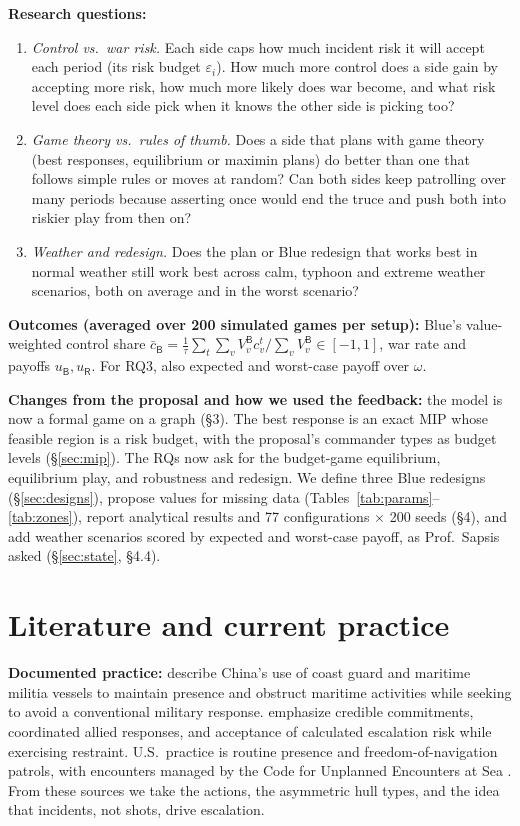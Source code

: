 \documentclass[10pt]{article}
\newcommand{\1}{\mathbf{1}}
\newcommand{\B}{\mathsf{B}}
\newcommand{\Rd}{\mathsf{R}}
\begin{document}
\textbf{Research questions:}
\begin{enumerate}[label=\textbf{RQ\arabic*.}]
\item \emph{Control vs.\ war risk.} Each side caps how much incident risk it will accept each period (its risk
budget $\varepsilon_i$). How much more control does a side gain by accepting more risk, how much more likely does
war become, and what risk level does each side pick when it knows the other side is picking too?
\item \emph{Game theory vs.\ rules of thumb.} Does a side that plans with game theory (best responses,
equilibrium or maximin plans) do better than one that follows simple rules or moves at random? Can both sides
keep patrolling over many periods because asserting once would end the truce and push both into riskier play from
then on?
\item \emph{Weather and redesign.} Does the plan or Blue redesign that works best in normal weather still work
best across calm, typhoon and extreme weather scenarios, both on average and in the worst scenario?
\end{enumerate}
\textbf{Outcomes (averaged over 200 simulated games per setup):} Blue's value-weighted control share
$\bar c_\B=\frac1\tau\sum_t\sum_{v}V^\B_v c^t_v/\sum_v V^\B_v\in[-1,1]$, war rate and payoffs $u_\B,u_\Rd$. For RQ3,
also expected and worst-case payoff over $\omega$.

\textbf{Changes from the proposal and how we used the feedback:} the model is now a formal game on a graph (\S3).
The best response is an exact MIP whose feasible region is a risk budget, with the proposal's commander types as
budget levels (\S\ref{sec:mip}). The RQs now ask for the budget-game equilibrium, equilibrium play, and robustness
and redesign. We define three Blue redesigns (\S\ref{sec:designs}), propose values for missing data
(Tables~\ref{tab:params}--\ref{tab:zones}), report analytical results and 77 configurations $\times$ 200 seeds
(\S4), and add weather scenarios scored by expected and worst-case payoff, as Prof.\ Sapsis asked (\S\ref{sec:state},
\S4.4).

\section{Literature and current practice}
\textbf{Documented practice:} 
\citet{helmus2024} describe China's use of coast guard and maritime militia vessels to 
maintain presence and obstruct maritime activities while seeking to avoid a conventional military response. 
\citet{green2017} emphasize credible commitments, coordinated allied responses, and acceptance of calculated escalation risk while exercising restraint.
U.S.\ practice is routine presence and freedom-of-navigation patrols, with encounters managed
by the Code for Unplanned Encounters at Sea \citep{cues2014}. From these sources we take the actions,
the asymmetric hull types, and the idea that incidents, not shots, drive escalation.
\end{document}
